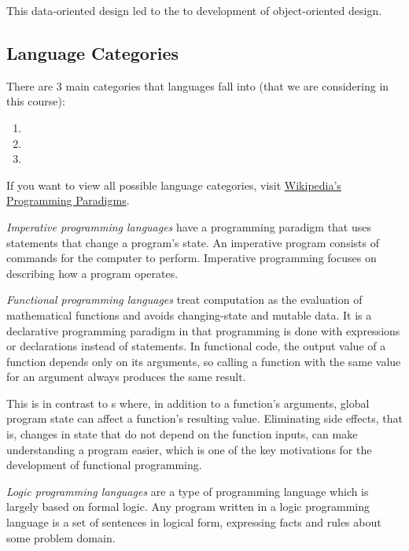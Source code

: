 This data-oriented design led to the to development of object-oriented design.

\subsection{Language Categories}\label{subsec:Language_Categories}
There are 3 main categories that languages fall into (that we are considering in this course):
\begin{enumerate}[noitemsep]
\item {}
\item {}
\item {}
\end{enumerate}

If you want to view all possible language categories, visit \href{https://en.wikipedia.org/wiki/Programming_paradigm}{Wikipedia's Programming Paradigms}.

\begin{definition}\label{def:Imperative_Programming_Language}
  \emph{Imperative programming languages} have a programming paradigm that uses statements that change a program's state.
  An imperative program consists of commands for the computer to perform.
  Imperative programming focuses on describing how a program operates.
\end{definition}

\begin{definition}\label{def:Functional_Programming_Language}
  \emph{Functional programming languages} treat computation as the evaluation of mathematical functions and avoids changing-state and mutable data.
  It is a declarative programming paradigm in that programming is done with expressions or declarations instead of statements.
  In functional code, the output value of a function depends only on its arguments, so calling a function with the same value for an argument always produces the same result.

  This is in contrast to s where, in addition to a function's arguments, global program state can affect a function's resulting value.
  Eliminating side effects, that is, changes in state that do not depend on the function inputs, can make understanding a program easier, which is one of the key motivations for the development of functional programming. 
\end{definition}

\begin{definition}\label{def:Logical_Programming_Language}
  \emph{Logic programming languages} are a type of programming language which is largely based on formal logic.
  Any program written in a logic programming language is a set of sentences in logical form, expressing facts and rules about some problem domain.
\end{definition}
